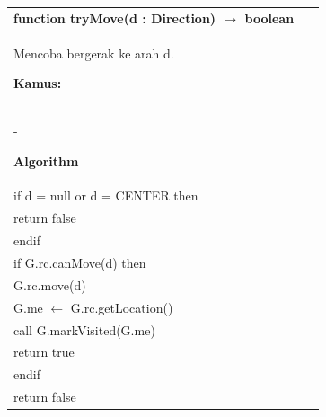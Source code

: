 \documentclass{article}
\newenvironment{pseudobox}
{
\centering
\begin{longtable}{|p{0.94\linewidth}|}
\hline
}
{
\\ \hline
\end{longtable}
\vspace{0.05cm}
}
\begin{document}
\begin{pseudobox}
\textbf{function tryMove(d : Direction) $\rightarrow$ boolean} \\
{ Mencoba bergerak ke arah d. }

\textbf{Kamus:} \\
\hspace*{1em} -

\textbf{Algorithm} \\
\hspace*{1em} if d = null or d = CENTER then \\
\hspace*{2em} return false \\
\hspace*{1em} endif \\

\hspace*{1em} if G.rc.canMove(d) then \\
\hspace*{2em} G.rc.move(d) \\
\hspace*{2em} G.me $\leftarrow$ G.rc.getLocation() \\
\hspace*{2em} call G.markVisited(G.me) \\
\hspace*{2em} return true \\
\hspace*{1em} endif \\

\hspace*{1em} return false
\end{pseudobox}
\end{document}
